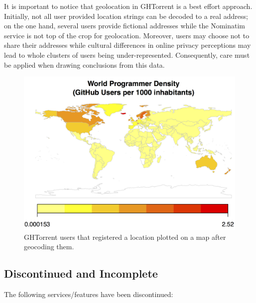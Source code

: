 \documentclass{sig-alternate}
\begin{document}
It is important to notice that geolocation in GHTorrent is a best effort
approach. Initially, not all user provided location strings can be decoded to a
real address; on the one hand, several users provide fictional addresses while
the Nominatim service is not top of the crop for geolocation.
Moreover, users may choose not to share their addresses while cultural
differences in online privacy perceptions may lead to whole clusters of users
being under-represented. Consequently, care must be applied when drawing
conclusions from this data.

\begin{figure}
  \begin{center}
    \includegraphics[scale=0.2]{dev-map.png}
  \end{center}
  \caption{GHTorrent users that registered a location plotted on a map after
  geocoding them.}
  \label{fig:dev-map}
\end{figure}

\subsection{Discontinued and Incomplete}

The following services/features have been discontinued:
\end{document}
